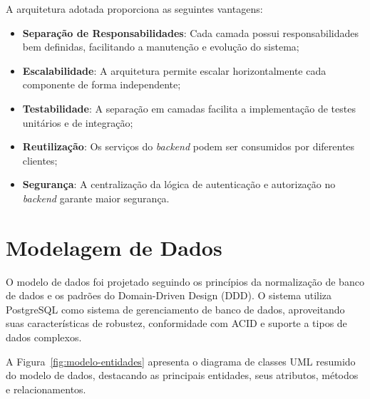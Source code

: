 A arquitetura adotada proporciona as seguintes vantagens:

\begin{itemize}
    \item \textbf{Separação de Responsabilidades}: Cada camada possui responsabilidades bem definidas, facilitando a manutenção e evolução do sistema;
    \item \textbf{Escalabilidade}: A arquitetura permite escalar horizontalmente cada componente de forma independente;
    \item \textbf{Testabilidade}: A separação em camadas facilita a implementação de testes unitários e de integração;
    \item \textbf{Reutilização}: Os serviços do \textit{backend} podem ser consumidos por diferentes clientes;
    \item \textbf{Segurança}: A centralização da lógica de autenticação e autorização no \textit{backend} garante maior segurança.
\end{itemize}

\section{Modelagem de Dados}

O modelo de dados foi projetado seguindo os princípios da normalização de banco de dados e os padrões do Domain-Driven Design (DDD). O sistema utiliza PostgreSQL como sistema de gerenciamento de banco de dados, aproveitando suas características de robustez, conformidade com ACID e suporte a tipos de dados complexos.

A Figura~\ref{fig:modelo-entidades} apresenta o diagrama de classes UML resumido do modelo de dados, destacando as principais entidades, seus atributos, métodos e relacionamentos.

